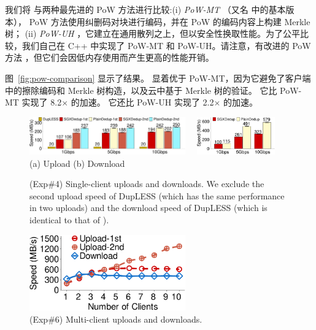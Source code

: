 我们将 \sysname 与两种最先进的 PoW 方法进行比较:(i) \textit{ PoW-MT} \cite{halevi11}（又名 \cite{halevi11} 中的基本版本）， PoW 方法使用纠删码对块进行编码，并在 PoW 的编码内容上构建 Merkle 树； (ii) \textit{ PoW-UH} \cite{xu13}，它建立在通用散列之上，但以安全性换取性能。为了公平比较，我们自己在 C++ 中实现了 PoW-MT 和 PoW-UH。请注意，有改进的 PoW 方法 \cite{halevi11}，但它们会因低内存使用而产生更高的性能开销。


图~\ref{fig:pow-comparison} 显示了结果。 \sysname 显着优于 PoW-MT，因为它避免了客户端中的擦除编码和 Merkle 树构造，以及云中基于 Merkle 树的验证。 它比 PoW-MT 实现了 8.2$\times$ 的加速。 它还比 PoW-UH 实现了 2.2$\times$ 的加速。


\begin{figure}[t]
  \centering
  \includegraphics[width=0.6\textwidth]{pic/sgxdedup/upload_network_speed_bar.pdf} \ \ 
  \includegraphics[width=0.3\textwidth]{pic/sgxdedup/download_network_speed_bar.pdf}
  \vspace{-3pt}\\
    \hspace{1.1in} {\small (a) Upload} \hspace{1.9in}
  {\small (b) Download}
  \vspace{-6pt}\\
  \caption{(Exp\#4) Single-client uploads and downloads. We exclude the second upload speed of DupLESS (which has the same performance in two uploads) and the download speed of DupLESS (which is identical to that of  \sysname).}
  \label{fig:singleClientThroughput}
\end{figure}

\begin{figure}[t]
  \centering
  \includegraphics[width=0.6\textwidth]{pic/sgxdedup/expb1_multiple_client.pdf}  
  \caption{(Exp\#6) Multi-client uploads and downloads.}
  \label{fig:multiClientThroughput}
\end{figure}

